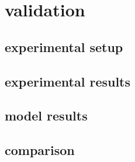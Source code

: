 \documentclass[../thesis.tex]{subfiles}
\begin{document}
\chapter{validation}
\label{chp:validation}

\section{experimental setup}

\section{experimental results}

\section{model results}
\label{sec: model res}

\section{comparison}
\end{document}
